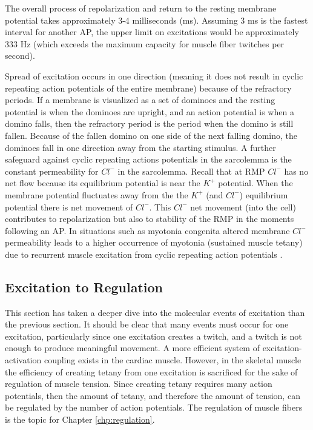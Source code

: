The overall process of repolarization and return to the resting membrane potential takes approximately 3-4 milliseconds (ms). Assuming 3 ms is the fastest interval for another AP, the upper limit on excitations would be approximately 333 Hz (which exceeds the maximum capacity for muscle fiber twitches per second).

Spread of excitation occurs in one direction (meaning it does not result in cyclic repeating action potentials of the entire membrane) because of the refractory periods. If a membrane is visualized as a set of dominoes and the resting potential is when the dominoes are upright, and an action potential is when a domino falls, then the refractory period is the period when the domino is still fallen. Because of the fallen domino on one side of the next falling domino, the dominoes fall in one direction away from the starting stimulus. A further safeguard against cyclic repeating actions potentials in the sarcolemma is the constant permeability for $Cl^-$ in the sarcolemma. Recall that at RMP $Cl^-$ has no net flow because its equilibrium potential is near the $K^+$ potential. When the membrane potential fluctuates away from the the $K^+$ (and $Cl^-$) equilibrium potential there is net movement of $Cl^-$. This $Cl^-$ net movement (into the cell) contributes to repolarization but also to stability of the RMP in the moments following an AP. In situations such as myotonia congenita altered membrane $Cl^-$ permeability leads to a higher occurrence of myotonia (sustained muscle tetany) due to recurrent muscle excitation from cyclic repeating action potentials \cite{adrian_action_1976}.

\subsection{Excitation to Regulation}

This section has taken a deeper dive into the molecular events of excitation than the previous section. It should be clear that many events must occur for one excitation, particularly since one excitation creates a twitch, and a twitch is not enough to produce meaningful movement. A more efficient system of excitation-activation coupling exists in the cardiac muscle. However, in the skeletal muscle the efficiency of creating tetany from one excitation is sacrificed for the sake of regulation of muscle tension. Since creating tetany requires many action potentials, then the amount of tetany, and therefore the amount of tension, can be regulated by the number of action potentials. The regulation of muscle fibers is the topic for Chapter \ref{chp:regulation}.


